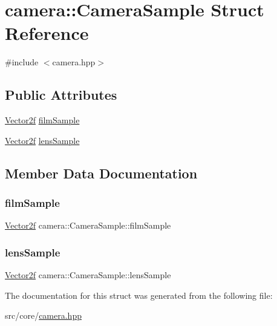 \hypertarget{structcamera_1_1CameraSample}{}\section{camera\+::Camera\+Sample Struct Reference}
\label{structcamera_1_1CameraSample}


{\ttfamily \#include $<$camera.\+hpp$>$}

\subsection*{Public Attributes}
\begin{DoxyCompactItemize}
\item 
\mbox{\hyperlink{cyclop_8hpp_a0c5eff6545fe0b71d0592c88d930b697}{Vector2f}} \mbox{\hyperlink{structcamera_1_1CameraSample_a7c713438553088facd9744cebfcbbc6a}{film\+Sample}}
\item 
\mbox{\hyperlink{cyclop_8hpp_a0c5eff6545fe0b71d0592c88d930b697}{Vector2f}} \mbox{\hyperlink{structcamera_1_1CameraSample_af3f634b330e18195c81d930fd2cb7fa6}{lens\+Sample}}
\end{DoxyCompactItemize}


\subsection{Member Data Documentation}
\mbox{\label{structcamera_1_1CameraSample_a7c713438553088facd9744cebfcbbc6a}} 
\subsubsection{\texorpdfstring{filmSample}{filmSample}}
{\footnotesize\ttfamily \mbox{\hyperlink{cyclop_8hpp_a0c5eff6545fe0b71d0592c88d930b697}{Vector2f}} camera\+::\+Camera\+Sample\+::film\+Sample}

\mbox{\label{structcamera_1_1CameraSample_af3f634b330e18195c81d930fd2cb7fa6}} 
\subsubsection{\texorpdfstring{lensSample}{lensSample}}
{\footnotesize\ttfamily \mbox{\hyperlink{cyclop_8hpp_a0c5eff6545fe0b71d0592c88d930b697}{Vector2f}} camera\+::\+Camera\+Sample\+::lens\+Sample}



The documentation for this struct was generated from the following file\+:\begin{DoxyCompactItemize}
\item 
src/core/\mbox{\hyperlink{camera_8hpp}{camera.\+hpp}}\end{DoxyCompactItemize}
